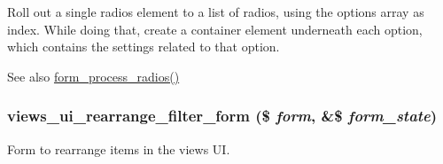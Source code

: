 Roll out a single radios element to a list of radios, using the options array as index. While doing that, create a container element underneath each option, which contains the settings related to that option.

\begin{DoxySeeAlso}{See also}
\hyperlink{group__form__api_ga61392e82fbc6eeeaf967b864da098ebc}{form\_\-process\_\-radios()} 
\end{DoxySeeAlso}
\hypertarget{admin_8inc_aabfbb223593fede3af3dad2a87579505}{
\subsubsection[{views\_\-ui\_\-rearrange\_\-filter\_\-form}]{\setlength{\rightskip}{0pt plus 5cm}views\_\-ui\_\-rearrange\_\-filter\_\-form (\$ {\em form}, \/  \&\$ {\em form\_\-state})}}
\label{admin_8inc_aabfbb223593fede3af3dad2a87579505}
Form to rearrange items in the views UI. 

